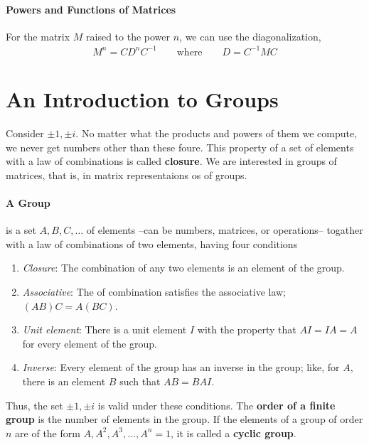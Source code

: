             \paragraph{Powers and Functions of Matrices}
            For the matrix $M$ raised to the power $n$, we can use the diagonalization,
            \begin{align*}
                M^n = C D^n C^{-1} \qquad \text{where} \qquad D = C^{-1} M C
            \end{align*}
        \section{An Introduction to Groups}
            Consider $\pm 1, \pm i$. No matter what the products and powers of them we compute, we never get numbers other than these foure. This  property of a set 
            of elements with a law of combinations is called \textbf{closure}. We are interested in groups of matrices, that is, in matrix representaions os of groups.

            \paragraph{A Group} %
            \label{par:A Group}
            is a set ${A, B, C, \dots}$ of elements --can be numbers, matrices, or operations-- togather with a law of combinations of two elements,  having four 
            conditions 
            \begin{enumerate}
                \item \textit{Closure}: The combination of any two elements is an element of the group.
                \item \textit{Associative}: The of combination satisfies the associative law; $(AB)C = A(BC)$.
                \item \textit{Unit element}: There is a unit element $I$ with the property that $AI = IA = A$ for every element of the group.
                \item \textit{Inverse}: Every element of the group has an inverse in the group; like, for $A$, there is an element $B$ such that $AB = BA I$.
            \end{enumerate}
            
            \bulletpar Thus, the set $\pm 1, \pm i$ is valid under these conditions. The \textbf{order of a finite group} is the number of elements in the group. If the elements 
            of a group of order $n$ are of the form $A, A^2, A^3, \dots, A^n =1$, it is called a \textbf{cyclic group}.

